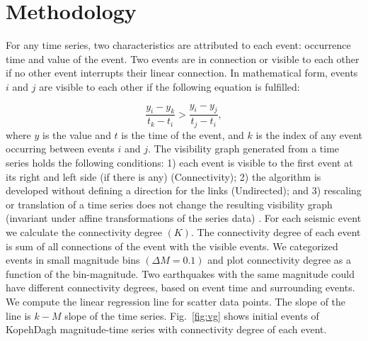 \section{Methodology}
\noindent
For any time series, two characteristics are attributed to each event: occurrence time and value of the event. Two events are in connection or visible to each other if no other event interrupts their linear connection. In mathematical form, events $i$ and $j$ are visible to each other if the following equation is fulfilled:

\begin{equation}
\frac{y_i - y_k }{t_k - t_i} > \frac{y_i - y_j}{ t_j - t_i} ,
\end{equation}
\noindent
where $y$ is the value and $t$ is the time of the event, and $k$ is the index of any event occurring between events  $i$  and  $j$. The visibility graph generated from a time series holds the following conditions: 1) each event is visible to the first event at its right and left side (if there is any) (Connectivity); 2) the algorithm is developed without defining a direction for the links (Undirected); and 3) rescaling or translation of a time series does not change the resulting visibility graph (invariant under affine transformations of the series data) \citep{Lacasa2008}. 
\noindent
For each seismic event we calculate the connectivity degree $(K)$. The connectivity degree of each event is sum of all connections of the event with the visible events. We categorized events in small magnitude bins $(\Delta M=0.1)$ and plot connectivity degree as a function of the bin-magnitude. Two earthquakes with the same magnitude could have different connectivity degrees, based on event time and surrounding events. We compute the linear regression line for scatter data points. The slope of the line is $k-M$ slope of the time series. Fig.~\ref{fig:vg} shows initial events of KopehDagh magnitude-time series with connectivity degree of each event. 

